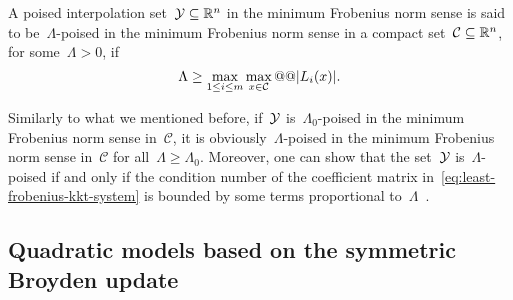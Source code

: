 \begin{definition}
    \label{def:lambda-poisedness-minimum-norm}
    A poised interpolation set~$\xpt \subseteq \R^n$ in the minimum Frobenius norm sense is said to be~$\Lambda$-poised in the minimum Frobenius norm sense in a compact set~$\mathcal{C} \subseteq \mathbb{R}^n$, for some~$\Lambda > 0$, if
    \begin{equation*}
        \Lambda \ge \max_{1 \le i \le m} \max_{\iter \in \mathcal{C}} @@ \abs{\lagp[i](\iter)}.
    \end{equation*}
\end{definition}

Similarly to what we mentioned before, if~$\xpt$ is~$\Lambda_0$-poised in the minimum Frobenius norm sense in~$\mathcal{C}$, it is obviously~$\Lambda$-poised in the minimum Frobenius norm sense in~$\mathcal{C}$ for all~$\Lambda \ge \Lambda_0$.
Moreover, one can show that the set~$\xpt$ is~$\Lambda$-poised if and only if the condition number of the coefficient matrix in~\cref{eq:least-frobenius-kkt-system} is bounded by some terms proportional to~$\Lambda$~\cite[Thm.~5.8]{Conn_Scheinberg_Vicente_2009b}.

\subsection{Quadratic models based on the symmetric Broyden update}
\label{subsec:symmetric-broyden-updates}

